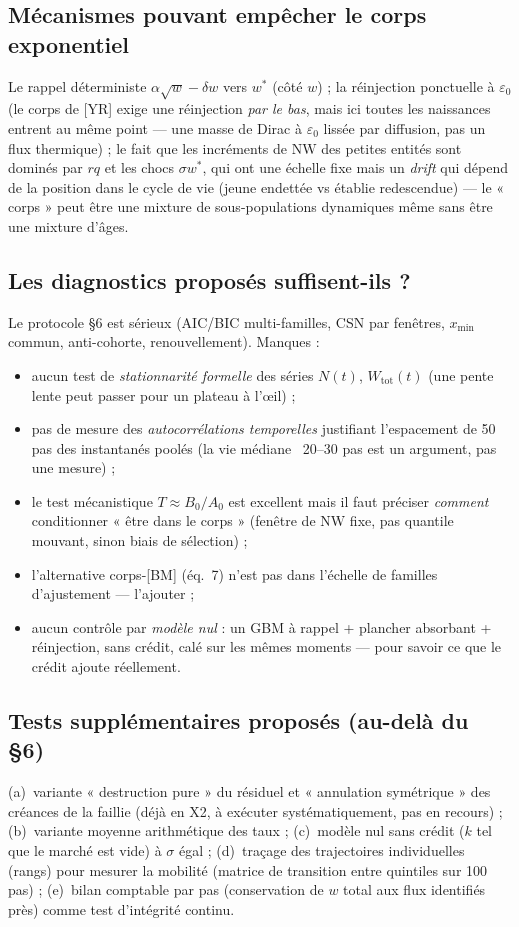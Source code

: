\documentclass[11pt,a4paper]{article}
\newcommand{\NW}{\mathrm{NW}}
\begin{document}
\subsection{Mécanismes pouvant empêcher le corps exponentiel}
Le rappel déterministe $\alpha\sqrt{w} - \delta w$ vers $w^*$ (côté $w$) ;
la réinjection ponctuelle à $\varepsilon_0$ (le corps de [YR] exige une
réinjection \emph{par le bas}, mais ici toutes les naissances entrent au
même point — une masse de Dirac à $\varepsilon_0$ lissée par diffusion, pas
un flux thermique) ; le fait que les incréments de $\NW$ des petites entités
sont dominés par $rq$ et les chocs $\sigma w^*$, qui ont une échelle fixe
mais un \emph{drift} qui dépend de la position dans le cycle de vie (jeune
endettée vs établie redescendue) — le « corps » peut être une mixture de
sous-populations dynamiques même sans être une mixture d'âges.

\subsection{Les diagnostics proposés suffisent-ils ?}
Le protocole §6 est sérieux (AIC/BIC multi-familles, CSN par fenêtres,
$x_{\min}$ commun, anti-cohorte, renouvellement). Manques :
\begin{itemize}[nosep]
\item aucun test de \emph{stationnarité formelle} des séries $N(t)$,
  $W_{\mathrm{tot}}(t)$ (une pente lente peut passer pour un plateau à
  l'œil) ;
\item pas de mesure des \emph{autocorrélations temporelles} justifiant
  l'espacement de 50 pas des instantanés poolés (la vie médiane ~20--30 pas
  est un argument, pas une mesure) ;
\item le test mécanistique $T \approx B_0/A_0$ est excellent mais il faut
  préciser \emph{comment} conditionner « être dans le corps » (fenêtre de
  $\NW$ fixe, pas quantile mouvant, sinon biais de sélection) ;
\item l'alternative corps-[BM] (éq.~7) n'est pas dans l'échelle de familles
  d'ajustement — l'ajouter ;
\item aucun contrôle par \emph{modèle nul} : un GBM à rappel + plancher
  absorbant + réinjection, sans crédit, calé sur les mêmes moments — pour
  savoir ce que le crédit ajoute réellement.
\end{itemize}

\subsection{Tests supplémentaires proposés (au-delà du §6)}
(a)~variante « destruction pure » du résiduel et « annulation symétrique »
des créances de la faillie (déjà en X2, à exécuter systématiquement, pas en
recours) ; (b)~variante moyenne arithmétique des taux ; (c)~modèle nul sans
crédit ($k$ tel que le marché est vide) à $\sigma$ égal ; (d)~traçage des
trajectoires individuelles (rangs) pour mesurer la mobilité
(matrice de transition entre quintiles sur 100 pas) ; (e)~bilan comptable
par pas (conservation de $w$ total aux flux identifiés près) comme test
d'intégrité continu.
\end{document}

